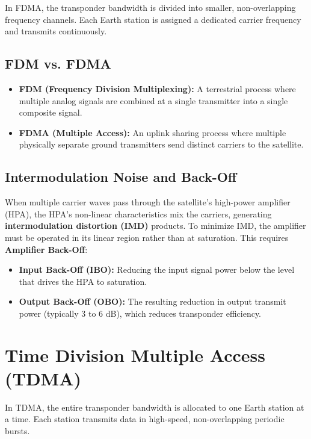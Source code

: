\documentclass[12pt,a4paper]{article}
\begin{document}
In FDMA, the transponder bandwidth is divided into smaller, non-overlapping frequency channels. Each Earth station is assigned a dedicated carrier frequency and transmits continuously.

\subsection{FDM vs. FDMA}
\begin{itemize}[leftmargin=*, itemsep=3.5pt]
  \item \textbf{FDM (Frequency Division Multiplexing):} A terrestrial process where multiple analog signals are combined at a single transmitter into a single composite signal.
  \item \textbf{FDMA (Multiple Access):} An uplink sharing process where multiple physically separate ground transmitters send distinct carriers to the satellite.
\end{itemize}

\subsection{Intermodulation Noise and Back-Off}
When multiple carrier waves pass through the satellite's high-power amplifier (HPA), the HPA's non-linear characteristics mix the carriers, generating \textbf{intermodulation distortion (IMD)} products.
To minimize IMD, the amplifier must be operated in its linear region rather than at saturation. This requires \textbf{Amplifier Back-Off}:
\begin{itemize}[leftmargin=*, itemsep=3.5pt]
  \item \textbf{Input Back-Off (IBO):} Reducing the input signal power below the level that drives the HPA to saturation.
  \item \textbf{Output Back-Off (OBO):} The resulting reduction in output transmit power (typically 3 to 6 dB), which reduces transponder efficiency.
\end{itemize}

\section{Time Division Multiple Access (TDMA)}

In TDMA, the entire transponder bandwidth is allocated to one Earth station at a time. Each station transmits data in high-speed, non-overlapping periodic bursts.
\end{document}
